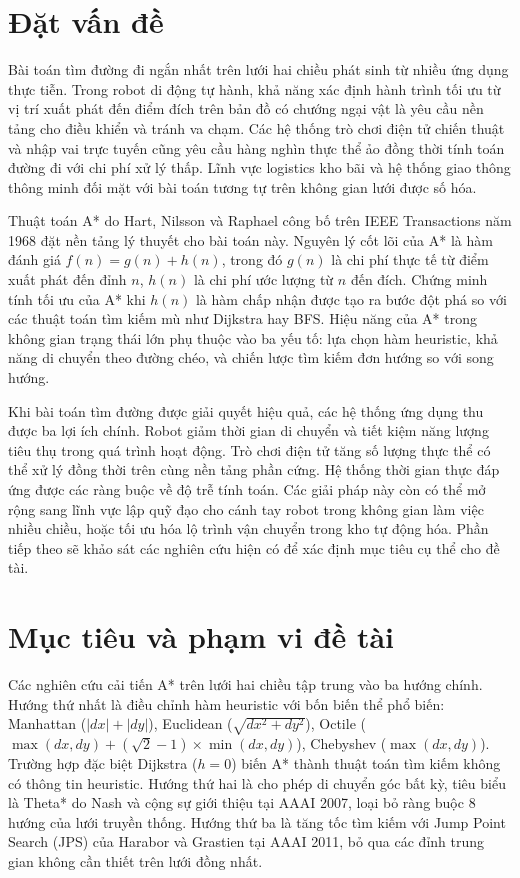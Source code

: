 \documentclass[../BTL.tex]{subfiles}
\begin{document}
\section{Đặt vấn đề}
\label{section:1.1}

Bài toán tìm đường đi ngắn nhất trên lưới hai chiều phát sinh từ nhiều ứng dụng thực tiễn. Trong robot di động tự hành, khả năng xác định hành trình tối ưu từ vị trí xuất phát đến điểm đích trên bản đồ có chướng ngại vật là yêu cầu nền tảng cho điều khiển và tránh va chạm. Các hệ thống trò chơi điện tử chiến thuật và nhập vai trực tuyến cũng yêu cầu hàng nghìn thực thể ảo đồng thời tính toán đường đi với chi phí xử lý thấp. Lĩnh vực logistics kho bãi và hệ thống giao thông thông minh đối mặt với bài toán tương tự trên không gian lưới được số hóa.

Thuật toán A* do Hart, Nilsson và Raphael công bố trên IEEE Transactions năm 1968 đặt nền tảng lý thuyết cho bài toán này. Nguyên lý cốt lõi của A* là hàm đánh giá \(f(n) = g(n) + h(n)\), trong đó \(g(n)\) là chi phí thực tế từ điểm xuất phát đến đỉnh \(n\), \(h(n)\) là chi phí ước lượng từ \(n\) đến đích. Chứng minh tính tối ưu của A* khi \(h(n)\) là hàm chấp nhận được tạo ra bước đột phá so với các thuật toán tìm kiếm mù như Dijkstra hay BFS. Hiệu năng của A* trong không gian trạng thái lớn phụ thuộc vào ba yếu tố: lựa chọn hàm heuristic, khả năng di chuyển theo đường chéo, và chiến lược tìm kiếm đơn hướng so với song hướng.

Khi bài toán tìm đường được giải quyết hiệu quả, các hệ thống ứng dụng thu được ba lợi ích chính. Robot giảm thời gian di chuyển và tiết kiệm năng lượng tiêu thụ trong quá trình hoạt động. Trò chơi điện tử tăng số lượng thực thể có thể xử lý đồng thời trên cùng nền tảng phần cứng. Hệ thống thời gian thực đáp ứng được các ràng buộc về độ trễ tính toán. Các giải pháp này còn có thể mở rộng sang lĩnh vực lập quỹ đạo cho cánh tay robot trong không gian làm việc nhiều chiều, hoặc tối ưu hóa lộ trình vận chuyển trong kho tự động hóa. Phần tiếp theo sẽ khảo sát các nghiên cứu hiện có để xác định mục tiêu cụ thể cho đề tài.

\section{Mục tiêu và phạm vi đề tài}
\label{section:1.2}

Các nghiên cứu cải tiến A* trên lưới hai chiều tập trung vào ba hướng chính. Hướng thứ nhất là điều chỉnh hàm heuristic với bốn biến thể phổ biến: Manhattan (\(|dx|+|dy|\)), Euclidean (\(\sqrt{dx^2+dy^2}\)), Octile (\(\max(dx,dy)+(\sqrt{2}-1)\times\min(dx,dy)\)), Chebyshev (\(\max(dx,dy)\)). Trường hợp đặc biệt Dijkstra (\(h=0\)) biến A* thành thuật toán tìm kiếm không có thông tin heuristic. Hướng thứ hai là cho phép di chuyển góc bất kỳ, tiêu biểu là Theta* do Nash và cộng sự giới thiệu tại AAAI 2007, loại bỏ ràng buộc 8 hướng của lưới truyền thống. Hướng thứ ba là tăng tốc tìm kiếm với Jump Point Search (JPS) của Harabor và Grastien tại AAAI 2011, bỏ qua các đỉnh trung gian không cần thiết trên lưới đồng nhất.
\end{document}
